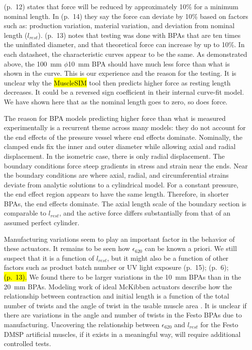 \documentclass[actuators,article,accept,pdftex,moreauthors]{Definitions/mdpi}
\begin{document}
\citet{festo_2026} (p.~12) states that force will be reduced by approximately 10\% for a minimum nominal length. In \citet{festo_2018} (p.~14) they say the force can deviate by 10\% based on factors such as: production variation, material variation, and deviation from nominal length ($l_{rest}$). \citet{festo_2013} (p.~13) notes that testing was done with BPAs that are ten times the uninflated diameter, and that theoretical force can increase by up to 10\%. In each datasheet, the characteristic curves appear to be the same. As demonstrated above, the \qty{100}{\mm} $\phi$\qty{10}{\mm} BPA should have much less force than what is shown in the curve. This is our experience and the reason for the testing. It is unclear why the \hl{MuscleSIM} %
 tool then predicts higher force as resting length decreases. It could be a reversed sign coefficient in their internal curve-fit model. We have shown here that as the nominal length goes to zero, so does force. 

The reason for BPA models predicting higher force than what is measured experimentally is a recurrent theme across many models: they do not account for the end effects of the pressure vessel where end effects dominate.	Nominally, the clamped ends fix the inner and outer diameter while allowing axial and radial displacement. In the isometric case, there is only radial displacement. The boundary conditions force steep gradients in stress and strain near the ends. Near the boundary conditions are where axial, radial, and circumferential strains deviate from analytic solutions to a cylindrical model. For a constant pressure, the end effect region appears to have the same length. Therefore, in shorter BPAs, the end effects dominate. The axial length scale of the boundary section is comparable to $l_{rest}$,  and the active force differs substantially from that of an assumed perfect cylinder.

Manufacturing variations seem to play an important factor in the behavior of these actuators. It remains to be seen how $\epsilon_{620}$ can be known a priori. We still suspect that it is a function of $l_{rest}$, but it might also be a function of other factors such as product batch number or UV light exposure \citep{festo_2026} (p.~15); \citep{festo_2018} (p.~6); \citep{festo_2013} \hl{(p.~13).} %
 We found there to be larger variations in the \qtylist{10}{\mm} BPAs than in the \qtylist{20}{\mm} BPAs. Modeling work of ideal McKibben actuators describe how the relationship between contraction and initial length is a function of the total number of twists and the angle of twist in the usable muscle area \citep{chou_measurement_1996}. It is unclear if there are variations in the angle and number of twists in the Festo BPAs due to manufacturing. Uncovering the relationship between $\epsilon_{620}$ and $l_{rest}$ for the Festo DMSP artificial muscles, if it exists in a meaningful way, will require additional controlled tests. 
\end{document}
